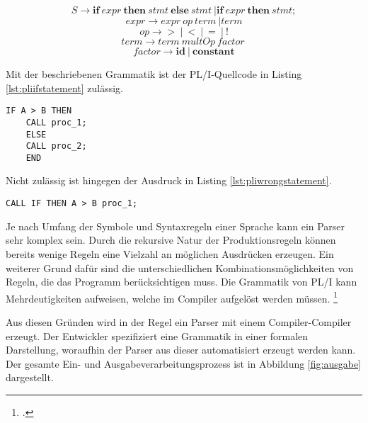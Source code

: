 \begin{center}
	\begin{equation}\label{eqn:start}
		S \to \mathbf{if}\: expr\: \mathbf{then}\: stmt\: \mathbf{else}\: stmt\: | \mathbf{if}\: expr\: \mathbf{then}\: stmt;
	\end{equation}
	\begin{equation}
		expr \to expr\: op\: term\: | term
	\end{equation}
	\begin{equation}
		op \to \mathbf{>}\: |\: \mathbf{<}\: |\: \mathbf{=}\: |\: \mathbf{!}
	\end{equation}
	\begin{equation}
		term \to term\: multOp\: factor\:
	\end{equation}
	\begin{equation}
		factor \to \mathbf{id}\: |\: \mathbf{constant}
	\end{equation}
\end{center}

\pagebreak
Mit der beschriebenen Grammatik ist der PL/I-Quellcode in Listing \ref{lst:pliifstatement} zulässig.

\begin{lstlisting}[language=PL/I, caption=PL/I-Verzweigung, label={lst:pliifstatement}]
	IF A > B THEN
	CALL proc_1;
	ELSE
	CALL proc_2;
	END
\end{lstlisting}

Nicht zulässig ist hingegen der Ausdruck in Listing \ref{lst:pliwrongstatement}.

\begin{lstlisting}[language=PL/I, caption=Ungültiges PL/I, label={lst:pliwrongstatement}]
	CALL IF THEN A > B proc_1;
\end{lstlisting}

Je nach Umfang der Symbole und Syntaxregeln einer Sprache kann ein Parser sehr komplex sein. 
Durch die rekursive Natur der Produktionsregeln können bereits wenige Regeln eine Vielzahl an möglichen Ausdrücken erzeugen.
Ein weiterer Grund dafür sind die unterschiedlichen Kombinationsmöglichkeiten von Regeln, die das Programm berücksichtigen muss. Die Grammatik von PL/I kann Mehrdeutigkeiten aufweisen, welche im Compiler aufgelöst werden müssen. \footcite[Vgl. ][S. 262ff. ]{compibau}

Aus diesen Gründen wird in der Regel ein Parser mit einem Compiler-Compiler erzeugt.
Der Entwickler spezifiziert eine Grammatik in einer formalen Darstellung, woraufhin der Parser aus dieser automatisiert erzeugt werden kann. Der gesamte Ein- und Ausgabeverarbeitungsprozess ist in Abbildung \ref{fig:ausgabe} dargestellt.


